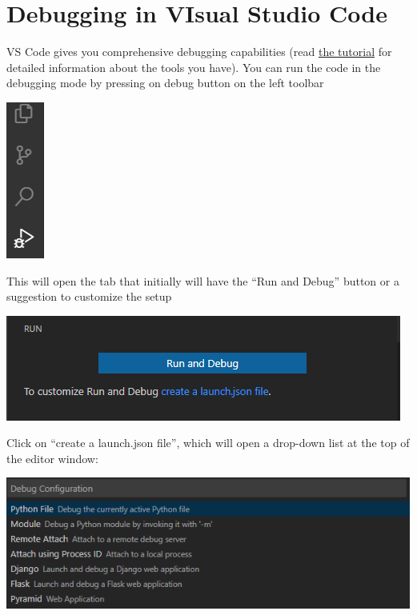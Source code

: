 \documentclass[
]{book}
\begin{document}
\hypertarget{debug-in-vs-code}{%
\section*{Debugging in VIsual Studio Code}\label{debug-in-vs-code}}

VS Code gives you comprehensive debugging capabilities (read \href{https://code.visualstudio.com/docs/python/python-tutorial}{the tutorial} for detailed information about the tools you have). You can run the code in the debugging mode by pressing on debug button on the left toolbar

\begin{center}\includegraphics[width=0.05\linewidth]{images/vscode-debug-button} \end{center}

This will open the tab that initially will have the ``Run and Debug'' button or a suggestion to customize the setup

\begin{center}\includegraphics[width=1\linewidth]{images/vscode-rundebug} \end{center}

Click on ``create a launch.json file'', which will open a drop-down list at the top of the editor window:

\begin{center}\includegraphics[width=1\linewidth]{images/vscode-debug-options} \end{center}
\end{document}
